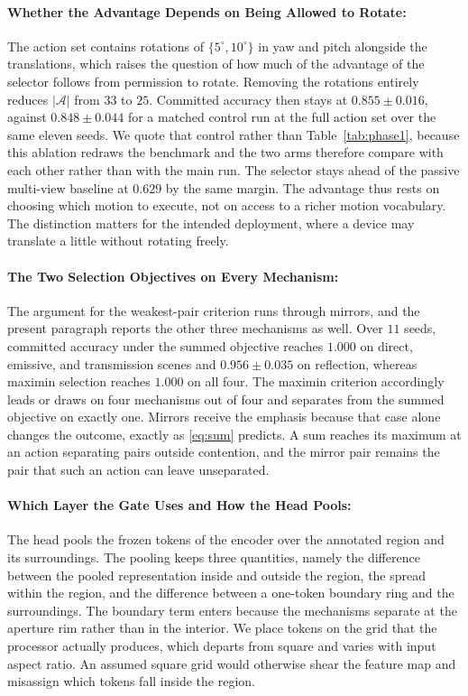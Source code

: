 \documentclass{article} %
\theoremstyle{defstyle}
\theoremstyle{plain}
\begin{document}
\paragraph{Whether the Advantage Depends on Being Allowed to Rotate:}
The action set contains rotations of $\{5^\circ, 10^\circ\}$ in yaw and pitch alongside the
translations, which raises the question of how much of the advantage of the selector follows
from permission to rotate. Removing the rotations entirely reduces $|\mathcal{A}|$ from $33$ to
$25$. Committed accuracy then stays at $0.855 \pm 0.016$, against $0.848 \pm 0.044$ for a
matched control run at the full action set over the same eleven seeds. We quote that control
rather than Table~\ref{tab:phase1}, because this ablation redraws the benchmark and the two
arms therefore compare with each other rather than with the main run. The selector stays ahead
of the passive multi-view baseline at $0.629$ by the same margin. The advantage thus rests on
choosing which motion to execute, not on access to a richer motion vocabulary. The distinction
matters for the intended deployment, where a device may translate a little without rotating
freely.

\paragraph{The Two Selection Objectives on Every Mechanism:}
The argument for the weakest-pair criterion runs through mirrors, and the present paragraph
reports the other three mechanisms as well. Over $11$ seeds, committed accuracy under the
summed objective reaches $1.000$ on direct, emissive, and transmission scenes and $0.956 \pm
0.035$ on reflection, whereas maximin selection reaches $1.000$ on all four. The maximin
criterion accordingly leads or draws on four mechanisms out of four and separates from the
summed objective on exactly one. Mirrors receive the emphasis because that case alone changes
the outcome, exactly as \eqref{eq:sum} predicts. A sum reaches its maximum at an action
separating pairs outside contention, and the mirror pair remains the pair that such an action
can leave unseparated.

\paragraph{Which Layer the Gate Uses and How the Head Pools:}
The head pools the frozen tokens of the encoder over the annotated region and its surroundings.
The pooling keeps three quantities, namely the difference between the pooled representation
inside and outside the region, the spread within the region, and the difference between a
one-token boundary ring and the surroundings. The boundary term enters because the mechanisms
separate at the aperture rim rather than in the interior. We place tokens on the grid that the
processor actually produces, which departs from square and varies with input aspect ratio. An
assumed square grid would otherwise shear the feature map and misassign which tokens fall
inside the region.
\end{document}
